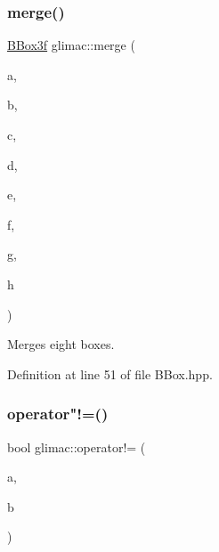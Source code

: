 \subsubsection{\texorpdfstring{merge()}{merge()}\hspace{0.1cm}{\footnotesize\ttfamily [6/6]}}
{\footnotesize\ttfamily \hyperlink{structglimac_1_1_b_box3f}{B\+Box3f} glimac\+::merge (\begin{DoxyParamCaption}\item[{const \hyperlink{structglimac_1_1_b_box3f}{B\+Box3f} \&}]{a,  }\item[{const \hyperlink{structglimac_1_1_b_box3f}{B\+Box3f} \&}]{b,  }\item[{const \hyperlink{structglimac_1_1_b_box3f}{B\+Box3f} \&}]{c,  }\item[{const \hyperlink{structglimac_1_1_b_box3f}{B\+Box3f} \&}]{d,  }\item[{const \hyperlink{structglimac_1_1_b_box3f}{B\+Box3f} \&}]{e,  }\item[{const \hyperlink{structglimac_1_1_b_box3f}{B\+Box3f} \&}]{f,  }\item[{const \hyperlink{structglimac_1_1_b_box3f}{B\+Box3f} \&}]{g,  }\item[{const \hyperlink{structglimac_1_1_b_box3f}{B\+Box3f} \&}]{h }\end{DoxyParamCaption})\hspace{0.3cm}{\ttfamily [inline]}}

Merges eight boxes. 

Definition at line 51 of file B\+Box.\+hpp.

\mbox{\label{namespaceglimac_af0e6fe83c5779c89714d6a864e9f74ac}} 
\subsubsection{\texorpdfstring{operator"!=()}{operator!=()}}
{\footnotesize\ttfamily bool glimac\+::operator!= (\begin{DoxyParamCaption}\item[{const \hyperlink{structglimac_1_1_b_box3f}{B\+Box3f} \&}]{a,  }\item[{const \hyperlink{structglimac_1_1_b_box3f}{B\+Box3f} \&}]{b }\end{DoxyParamCaption})\hspace{0.3cm}{\ttfamily [inline]}}



